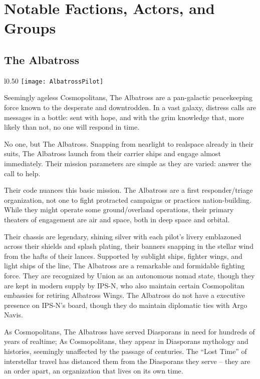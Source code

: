 \newpage
\section{Notable Factions, Actors, and Groups}

\subsection{The Albatross}
\begin{wrapfigure}{l}{0.50\textwidth}
   \centering
   \texttt{[image: AlbatrossPilot]}
 \end{wrapfigure}

Seemingly ageless Cosmopolitans, The Albatross are a pan-galactic peacekeeping
force known to the desperate and downtrodden. In a vast galaxy, distress calls
are messages in a bottle: sent with hope, and with the grim knowledge that, more
likely than not, no one will respond in time.

No one, but The Albatross. Snapping from nearlight to realspace already in their
suits, The Albatross launch from their carrier ships and engage almost
immediately. Their mission parameters are simple as they are varied: answer the
call to help.

Their code nuances this basic mission. The Albatross are a first
responder/triage organization, not one to fight protracted campaigns or
practices nation-building. While they might operate some ground/overland
operations, their primary theaters of engagement are air and space, both in deep
space and orbital.

Their chassis are legendary, shining silver with each pilot's livery emblazoned
across their shields and splash plating, their banners snapping in the stellar
wind from the hafts of their lances. Supported by sublight ships, fighter wings,
and light ships of the line, The Albatross are a remarkable and formidable
fighting force. They are recognized by Union as an autonomous nomad state,
though they are kept in modern supply by IPS-N, who also maintain certain
Cosmopolitan embassies for retiring Albatross Wings. The Albatross do not have a
executive presence on IPS-N's board, though they do maintain diplomatic ties
with Argo Navis.

As Cosmopolitans, The Albatross have served Diasporans in need for hundreds of
years of realtime; As Cosmopolitans, they appear in Diasporans mythology and
histories, seemingly unaffected by the passage of centuries. The ``Lost Time'' of
interstellar travel has distanced them from the Diasporans they serve -- they
are an order apart, an organization that lives on its own time.

